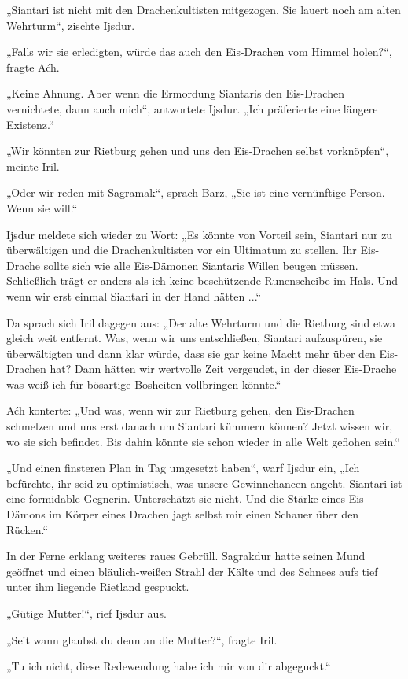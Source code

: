 „Siantari ist nicht mit den Drachenkultisten mitgezogen. Sie lauert noch am alten Wehrturm“, zischte Ijsdur.

„Falls wir sie erledigten, würde das auch den Eis-Drachen vom Himmel holen?“, fragte Aćh.

„Keine Ahnung. Aber wenn die Ermordung Siantaris den Eis-Drachen vernichtete, dann auch mich“, antwortete Ijsdur. „Ich präferierte eine längere Existenz.“

„Wir könnten zur Rietburg gehen und uns den Eis-Drachen selbst vorknöpfen“, meinte Iril.

„Oder wir reden mit Sagramak“, sprach Barz, „Sie ist eine vernünftige Person. Wenn sie will.“

Ijsdur meldete sich wieder zu Wort: „Es könnte von Vorteil sein, Siantari nur zu überwältigen und die Drachenkultisten vor ein Ultimatum zu stellen. Ihr Eis-Drache sollte sich wie alle Eis-Dämonen Siantaris Willen beugen müssen. Schließlich trägt er anders als ich keine beschützende Runenscheibe im Hals. Und wenn wir erst einmal Siantari in der Hand hätten ...“

Da sprach sich Iril dagegen aus: „Der alte Wehrturm und die Rietburg sind etwa gleich weit entfernt. Was, wenn wir uns entschließen, Siantari aufzuspüren, sie überwältigten und dann klar würde, dass sie gar keine Macht mehr über den Eis-Drachen hat? Dann hätten wir wertvolle Zeit vergeudet, in der dieser Eis-Drache was weiß ich für bösartige Bosheiten vollbringen könnte.“

Aćh konterte: „Und was, wenn wir zur Rietburg gehen, den Eis-Drachen schmelzen und uns erst danach um Siantari kümmern können? Jetzt wissen wir, wo sie sich befindet. Bis dahin könnte sie schon wieder in alle Welt geflohen sein.“

„Und einen finsteren Plan in Tag umgesetzt haben“, warf Ijsdur ein, „Ich befürchte, ihr seid zu optimistisch, was unsere Gewinnchancen angeht. Siantari ist eine formidable Gegnerin. Unterschätzt sie nicht. Und die Stärke eines Eis-Dämons im Körper eines Drachen jagt selbst mir einen Schauer über den Rücken.“

In der Ferne erklang weiteres raues Gebrüll. Sagrakdur hatte seinen Mund geöffnet und einen bläulich-weißen Strahl der Kälte und des Schnees aufs tief unter ihm liegende Rietland gespuckt.

„Gütige Mutter!“, rief Ijsdur aus.

„Seit wann glaubst du denn an die Mutter?“, fragte Iril.

„Tu ich nicht, diese Redewendung habe ich mir von dir abgeguckt.“

